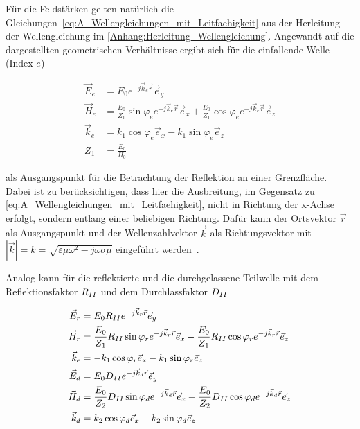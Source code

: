 Für die Feldstärken gelten natürlich die Gleichungen~\eqref{eq:A_Wellengleichungen_mit_Leitfaehigkeit} aus der Herleitung der Wellengleichung im \Anhang \ref{Anhang:Herleitung_Wellengleichung}. Angewandt auf die dargestellten geometrischen Verhältnisse ergibt sich für die einfallende Welle (Index \glqq$e$\grqq)~\cite{EM_Schirmung}

\begin{align}
    \vec E_e &= E_0 e^{-j\vec k_e \vec r} \vec e_y \\
    \vec H_e &= \frac{E_0}{Z_1} \sin{\varphi_e} e^{-j \vec k_e \vec r} \vec e_x + \frac{E_0}{Z_1} \cos{\varphi_e} e^{-j \vec k_e \vec r} \vec e_z \\
    \vec k_e &= k_1 \cos{\varphi_e} \vec e_x - k_1 \sin{\varphi_e} \vec e_z \\
    Z_1 &= \frac{E_0}{H_0}
\end{align}

als Ausgangspunkt für die Betrachtung der Reflektion an einer Grenzfläche. Dabei ist zu berücksichtigen, dass hier die Ausbreitung, im Gegensatz zu \Gleichungen \eqref{eq:A_Wellengleichungen_mit_Leitfaehigkeit}, nicht in Richtung der x-Achse erfolgt, sondern entlang einer beliebigen Richtung. Dafür kann der Ortsvektor $\vec r$ als Ausgangspunkt und der Wellenzahlvektor $\vec k$ als Richtungsvektor mit
$|\vec k| = k = \sqrt{\varepsilon \mu \omega^2 - j \omega \sigma \mu} $ eingeführt werden~\cite{EM_Schirmung}. \par \vspace{\linespace} Analog kann für die reflektierte und die durchgelassene Teilwelle mit dem Reflektionsfaktor $R_{\uproman{2}}$ und dem Durchlassfaktor $D_{\uproman{2}}$

\begin{align}
    \vec E_r &= E_0 R_{\uproman{2}} e^{-j\vec k_r \vec r} \vec e_y \\
    \vec H_r &= \frac{E_0}{Z_1} R_{\uproman{2}} \sin{\varphi_r} e^{-j \vec k_r \vec r} \vec e_x - \frac{E_0}{Z_1} R_{\uproman{2}} \cos{\varphi_r} e^{-j \vec k_r \vec r} \vec e_z \\
    \vec k_e &= - k_1 \cos{\varphi_r} \vec e_x - k_1 \sin{\varphi_r} \vec e_z \\
    \vec E_d &= E_0 D_{\uproman{2}} e^{-j\vec k_d \vec r} \vec e_y \\
    \vec H_d &= \frac{E_0}{Z_2} D_{\uproman{2}} \sin{\varphi_d} e^{-j \vec k_d \vec r} \vec e_x + \frac{E_0}{Z_2} D_{\uproman{2}} \cos{\varphi_d} e^{-j \vec k_d \vec r} \vec e_z \\
    \vec k_d &= k_2 \cos{\varphi_d} \vec e_x - k_2 \sin{\varphi_d} \vec e_z
\end{align}

